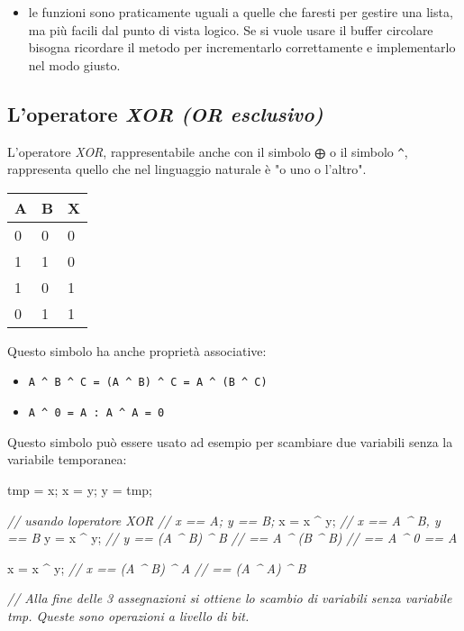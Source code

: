 \documentclass[
]{article}
\newenvironment{Shaded}{}{}
\newcommand{\CommentTok}[1]{\textcolor[rgb]{0.38,0.63,0.69}{\textit{#1}}}
\newcommand{\NormalTok}[1]{#1}
\begin{document}
\begin{itemize}
\item
  le funzioni sono praticamente uguali a quelle che faresti per gestire
  una lista, ma più facili dal punto di vista logico. Se si vuole usare
  il buffer circolare bisogna ricordare il metodo per incrementarlo
  correttamente e implementarlo nel modo giusto.
\end{itemize}

\hypertarget{header-n1473}{%
\subsection{\texorpdfstring{L'operatore \emph{XOR (OR
esclusivo)}}{L'operatore XOR (OR esclusivo)}}\label{header-n1473}}

L'operatore \emph{XOR}, rappresentabile anche con il simbolo \texttt{⨁}
o il simbolo \texttt{\^{}}, rappresenta quello che nel linguaggio
naturale è "o uno o l'altro".

\begin{longtable}[]{@{}lll@{}}
\toprule
A & B & X\tabularnewline
\midrule
\endhead
0 & 0 & 0\tabularnewline
1 & 1 & 0\tabularnewline
1 & 0 & 1\tabularnewline
0 & 1 & 1\tabularnewline
\bottomrule
\end{longtable}

Questo simbolo ha anche proprietà associative:

\begin{itemize}
\item
  \texttt{A\ \^{}\ B\ \^{}\ C\ =\ (A\ \^{}\ B)\ \^{}\ C\ =\ A\ \^{}\ (B\ \^{}\ C)}
\item
  \texttt{A\ \^{}\ 0\ =\ A\ :\ A\ \^{}\ A\ =\ 0}
\end{itemize}

Questo simbolo può essere usato ad esempio per scambiare due variabili
senza la variabile temporanea:

\begin{Shaded}
\begin{Highlighting}[]
\NormalTok{tmp = x;}
\NormalTok{x = y;}
\NormalTok{y = tmp;}

\CommentTok{// usando l\textquotesingle{}operatore XOR}
\CommentTok{// x == A; y == B;}
\NormalTok{x = x \^{} y; }\CommentTok{// x == A \^{} B, y == B}
\NormalTok{y = x \^{} y; }\CommentTok{// y == (A \^{} B) \^{} B}
		   \CommentTok{//   == A \^{} (B \^{} B)}
           \CommentTok{//   == A \^{} 0 == A}
           
\NormalTok{x = x \^{} y; }\CommentTok{// x == (A \^{} B) \^{} A }
		   \CommentTok{//   == (A \^{} A) \^{} B}

\CommentTok{// Alla fine delle 3 assegnazioni si ottiene lo scambio di variabili senza variabile tmp. Queste sono operazioni a livello di bit.}
\end{Highlighting}
\end{Shaded}
\end{document}
